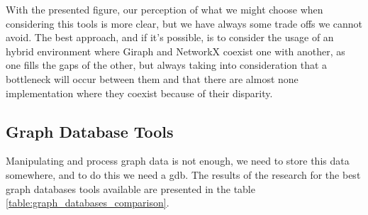 With the presented figure, our perception of what we might choose when considering this tools is more clear, but we have always some trade offs we cannot avoid. The best approach, and if it's possible, is to consider the usage of an hybrid environment where Giraph and NetworkX coexist one with another, as one fills the gaps of the other, but always taking into consideration that a bottleneck will occur between them \cite{graph_frameworks_performance_evaluation} and that there are almost none implementation where they coexist \cite{graph_frameworks_performance_evaluation} because of their disparity.

\subsection{Graph Database Tools}
\label{subsec:graph_database_tools}

Manipulating and process graph data is not enough, we need to store this data somewhere, and to do this we need a \gls{gdb}. The results of the research for the best graph databases tools available are presented in the table \ref{table:graph_databases_comparison}.


